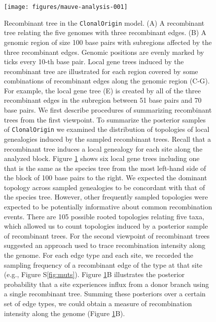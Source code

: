 \documentclass[english]{article}
\begin{document}
\begin{figure}
\texttt{[image: figures/mauve-analysis-001]}
\caption{\label{fig:clonalorigin}Recombinant tree in the \texttt{ClonalOrigin} model.
(A) A recombinant tree relating the five genomes with three recombinant edges.
(B) A genomic region of size 100 base pairs with subregions affected by the
three recombinant edges. Genomic positions are evenly marked by ticks every 
10-th base pair. Local gene trees induced by the recombinant tree are
illustrated for each region covered by some combinations of recombinant edges
along the genomic region (C-G). For example, the local gene tree (E) is created
by all of the three recombinant edges in the subregion between 51 base pairs
and 70 base pairs.
We first describe procedures of summarizing recombinant trees from the first
viewpoint.  To summarize the posterior samples of \texttt{ClonalOrigin} we
examined the distribution of topologies of local genealogies induced by the
sampled recombinant trees. Recall that a recombinant tree induces a local
genealogy for each site along the analyzed block.  Figure \ref{fig:clonalorigin}
shows six local gene trees including one that is the same as the species tree
from the most left-hand side of the block of 100 base pairs to the right.  We
expected the dominant topology across sampled genealogies to be concordant with
that of the species tree. However, other frequently sampled topologies were
expected to be potentially informative about common recombination events. There
are 105 possible rooted topologies relating five taxa, which allowed us to count
topologies induced by a posterior sample of recombinant trees.  
For the second viewpoint of recombinant trees \citet{Didelot2010} suggested an
approach used to trace recombination intensity along the genome.  For each edge
type and each site, we recorded the sampling frequency of a recombinant edge of
the type at that site (e.g., Figure S\ref{fig:muts}).  Figure
\ref{fig:clonalorigin}B illustrates the posterior probability that a site
experiences influx from a donor branch using a single recombinant tree.  Summing
these posteriors over a certain set of edge types, we could obtain a measure of
recombination intensity along the genome (Figure \ref{fig:clonalorigin}B).  
}
\end{figure}
\clearpage{}%
\end{document}
